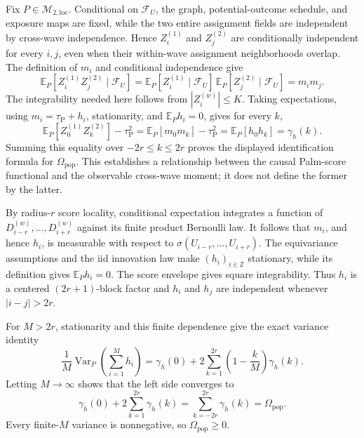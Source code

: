Fix \(P\in\mathcal M_{2,\mathrm{loc}}\).  Conditional on \(\mathcal F_U\), the graph, potential-outcome schedule, and exposure maps are fixed, while the two entire assignment fields are independent by cross-wave independence.  Hence \(Z_i^{(1)}\) and \(Z_j^{(2)}\) are conditionally independent for every \(i,j\), even when their within-wave assignment neighborhoods overlap.  The definition of \(m_i\) and conditional independence give
\[
 \mathbb E_P[Z_i^{(1)}Z_j^{(2)}\mid\mathcal F_U]
 =\mathbb E_P[Z_i^{(1)}\mid\mathcal F_U]\,
  \mathbb E_P[Z_j^{(2)}\mid\mathcal F_U]
 =m_im_j.
\]
The integrability needed here follows from \(|Z_i^{(w)}|\le K\).  Taking expectations, using \(m_i=\tau_{\mathrm P}+h_i\), stationarity, and \(\mathbb E_P h_i=0\), gives for every \(k\),
\[
 \mathbb E_P[Z_0^{(1)}Z_k^{(2)}]-\tau_{\mathrm P}^2
 =\mathbb E_P[m_0m_k]-\tau_{\mathrm P}^2
 =\mathbb E_P[h_0h_k]=\gamma_h(k).
\]
Summing this equality over \(-2r\le k\le2r\) proves the displayed identification formula for \(\Omega_{\mathrm{pop}}\).  This establishes a relationship between the causal Palm-score functional and the observable cross-wave moment; it does not define the former by the latter.

By radius-\(r\) score locality, conditional expectation integrates a function of \(D_{i-r}^{(w)},\ldots,D_{i+r}^{(w)}\) against its finite product Bernoulli law.  It follows that \(m_i\), and hence \(h_i\), is measurable with respect to \(\sigma(U_{i-r},\ldots,U_{i+r})\).  The equivariance assumptions and the iid innovation law make \((h_i)_{i\in\mathbb Z}\) stationary, while its definition gives \(\mathbb E_P h_i=0\).  The score envelope gives square integrability.  Thus \(h_i\) is a centered \((2r+1)\)-block factor and \(h_i\) and \(h_j\) are independent whenever \(|i-j|>2r\).

For \(M>2r\), stationarity and this finite dependence give the exact variance identity
\[
 \frac1M\operatorname{Var}_P\!\left(\sum_{i=1}^M h_i\right)
 =\gamma_h(0)+2\sum_{k=1}^{2r}\left(1-\frac{k}{M}\right)\gamma_h(k).
\]
Letting \(M\to\infty\) shows that the left side converges to
\[
 \gamma_h(0)+2\sum_{k=1}^{2r}\gamma_h(k)
 =\sum_{k=-2r}^{2r}\gamma_h(k)=\Omega_{\mathrm{pop}}.
\]
Every finite-\(M\) variance is nonnegative, so \(\Omega_{\mathrm{pop}}\ge0\).

